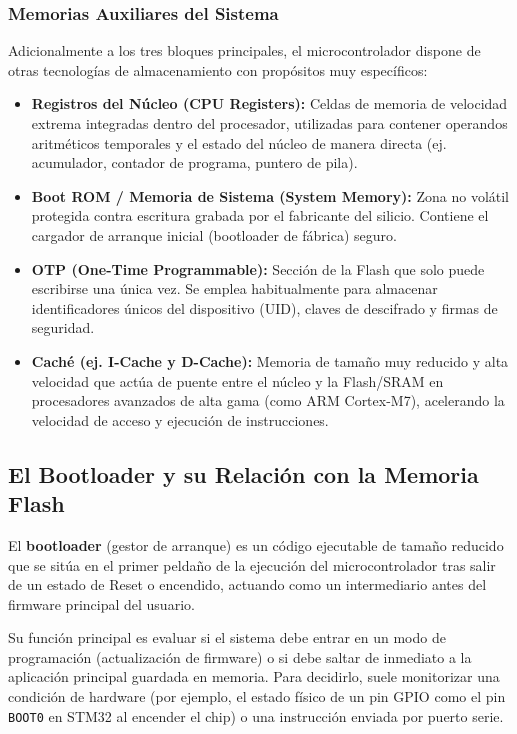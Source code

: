 \documentclass[
10pt, %
a4paper, %
oneside, %
headinclude,footinclude, %
BCOR5mm, %
]{scrartcl}
\begin{document}
\subsubsection{Memorias Auxiliares del Sistema}
Adicionalmente a los tres bloques principales, el microcontrolador dispone de otras tecnologías de almacenamiento con propósitos muy específicos:
\begin{itemize}
	\item \textbf{Registros del Núcleo (CPU Registers):} Celdas de memoria de velocidad extrema integradas dentro del procesador, utilizadas para contener operandos aritméticos temporales y el estado del núcleo de manera directa (ej. acumulador, contador de programa, puntero de pila).
	\item \textbf{Boot ROM / Memoria de Sistema (System Memory):} Zona no volátil protegida contra escritura grabada por el fabricante del silicio. Contiene el cargador de arranque inicial (bootloader de fábrica) seguro.
	\item \textbf{OTP (One-Time Programmable):} Sección de la Flash que solo puede escribirse una única vez. Se emplea habitualmente para almacenar identificadores únicos del dispositivo (UID), claves de descifrado y firmas de seguridad.
	\item \textbf{Caché (ej. I-Cache y D-Cache):} Memoria de tamaño muy reducido y alta velocidad que actúa de puente entre el núcleo y la Flash/SRAM en procesadores avanzados de alta gama (como ARM Cortex-M7), acelerando la velocidad de acceso y ejecución de instrucciones.
\end{itemize}

\subsection{El Bootloader y su Relación con la Memoria Flash}

El \textbf{bootloader} (gestor de arranque) es un código ejecutable de tamaño reducido que se sitúa en el primer peldaño de la ejecución del microcontrolador tras salir de un estado de Reset o encendido, actuando como un intermediario antes del firmware principal del usuario.

Su función principal es evaluar si el sistema debe entrar en un modo de programación (actualización de firmware) o si debe saltar de inmediato a la aplicación principal guardada en memoria. Para decidirlo, suele monitorizar una condición de hardware (por ejemplo, el estado físico de un pin GPIO como el pin \texttt{BOOT0} en STM32 al encender el chip) o una instrucción enviada por puerto serie.
\end{document}
